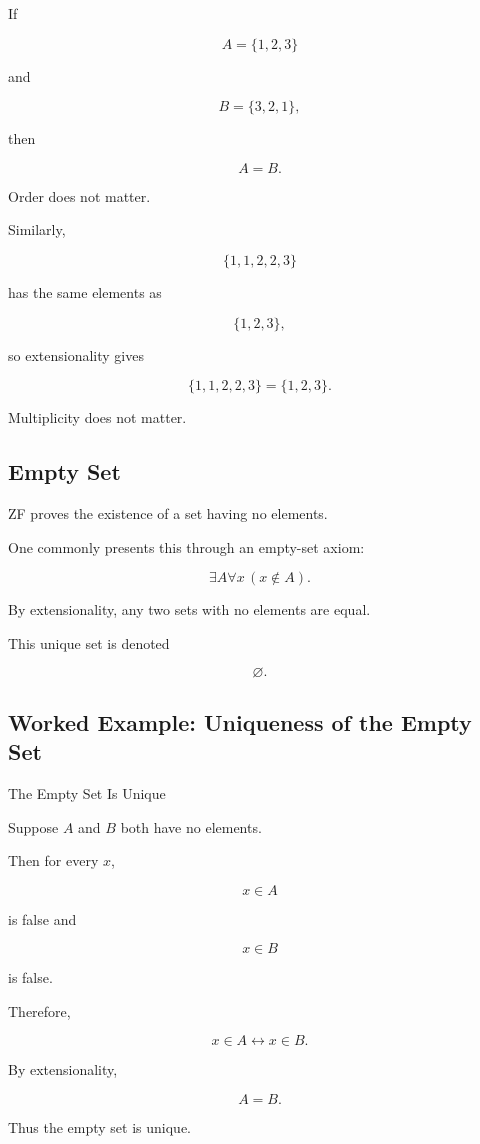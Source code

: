 If

\[
A=\{1,2,3\}
\]

and

\[
B=\{3,2,1\},
\]

then

\[
\boxed{
A=B.
}
\]

Order does not matter.

Similarly,

\[
\{1,1,2,2,3\}
\]

has the same elements as

\[
\{1,2,3\},
\]

so extensionality gives

\[
\boxed{
\{1,1,2,2,3\}
=
\{1,2,3\}.
}
\]

Multiplicity does not matter.

\subsection{Empty Set}
\label{subsec:axiomatic-empty-set}

ZF proves the existence of a set having no elements.

One commonly presents this through an empty-set axiom:

\[
\boxed{
\exists A
\forall x
\,
(x\notin A).
}
\]

By extensionality, any two sets with no elements are equal.

This unique set is denoted

\[
\boxed{
\varnothing.
}
\]

\subsection{Worked Example: Uniqueness of the Empty Set}
\label{subsec:worked-empty-set-uniqueness}

\begin{workedexamplebox}{The Empty Set Is Unique}

Suppose \(A\) and \(B\) both have no elements.

Then for every \(x\),

\[
x\in A
\]

is false and

\[
x\in B
\]

is false.

Therefore,

\[
x\in A
\leftrightarrow
x\in B.
\]

By extensionality,

\begin{answerbox}
\[
\boxed{
A=B.
}
\]
\end{answerbox}

Thus the empty set is unique.

\end{workedexamplebox}


